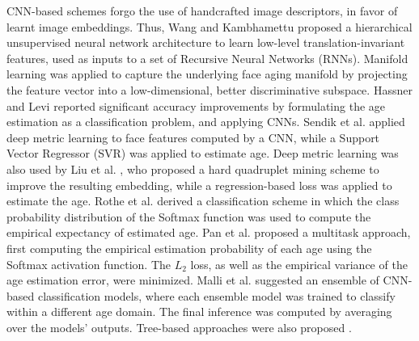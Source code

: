 \documentclass[10pt,journal]{IEEEtran}\usepackage{amsfonts}
\begin{document}
CNN-based schemes forgo the use of handcrafted image descriptors, in favor of
learnt image embeddings. Thus, Wang and Kambhamettu \cite{wang2015age}
proposed a hierarchical unsupervised neural network architecture to learn
low-level translation-invariant features, used as inputs to a set of Recursive
Neural Networks (RNNs). Manifold learning was applied to capture the
underlying face aging manifold by projecting the feature vector into a
low-dimensional, better discriminative subspace. Hassner and Levi
\cite{leviage} reported significant accuracy improvements by formulating the
age estimation as a classification problem, and applying CNNs. Sendik et al.
\cite{deepage} applied deep metric learning to face features computed by a
CNN, while a Support Vector Regressor (SVR) was applied to estimate age. Deep
metric learning was also used by Liu et al. \cite{8017500}, who proposed a
hard quadruplet mining scheme to improve the resulting embedding, while a
regression-based loss was applied to estimate the age. Rothe et al.
\cite{7406390} derived a classification scheme in which the class probability
distribution of the Softmax function was used to compute the empirical
expectancy of estimated age. Pan et al. \cite{Mean-Variance} proposed a
multitask approach, first computing the empirical estimation probability of
each age using the Softmax activation function. The $L_{2}$ loss, as well as
the empirical variance of the age estimation error, were minimized. Malli et
al. \cite{Malli_2016} suggested an ensemble of CNN-based classification
models, where each ensemble model was trained to classify within a different
age domain. The final inference was computed by averaging over the models'
outputs. Tree-based approaches were also proposed \cite{8954134, 8578343}.
\end{document}
